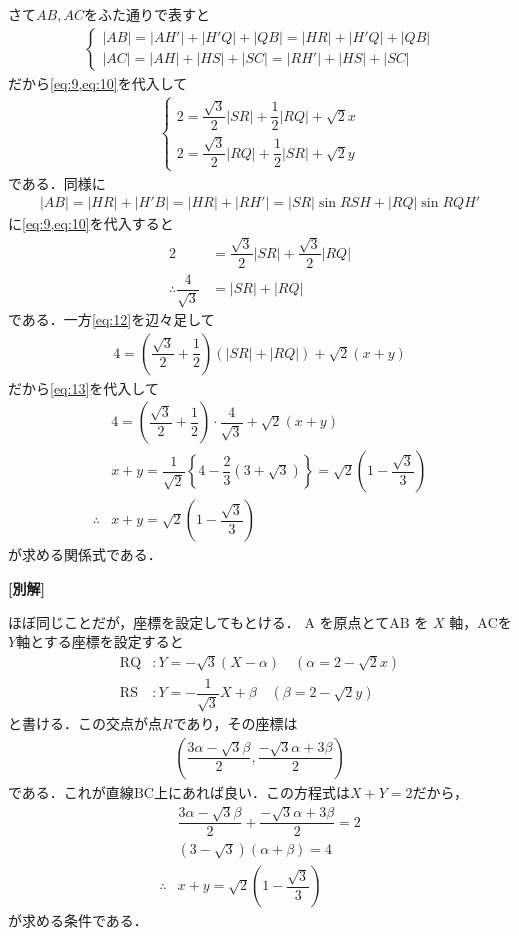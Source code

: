 \documentclass[../../main.tex]{subfiles}
\begin{document}
さて$AB,AC$をふた通りで表すと
\begin{align}
  \begin{cases}
    |AB|=|AH'|+|H'Q|+|QB|=|HR|+|H'Q|+|QB| \\
    |AC|=|AH|+|HS|+|SC|=|RH'|+|HS|+|SC|
  \end{cases}
\end{align}
だから\cref{eq:9,eq:10}を代入して
\begin{align}
  \begin{cases}
    2 = \dfrac{\sqrt{3}}{2}|SR| + \dfrac{1}{2}|RQ| + \sqrt{2}x \\
    2 = \dfrac{\sqrt{3}}{2}|RQ| + \dfrac{1}{2}|SR| + \sqrt{2}y
  \end{cases} \label{eq:12}
\end{align}
である．同様に
\begin{align}
  |AB|= |HR|+|H'B| = |HR|+|RH'| = |SR|\sin RSH + |RQ|\sin RQH'
\end{align}
に\cref{eq:9,eq:10}を代入すると
\begin{align}
  2 & = \dfrac{\sqrt{3}}{2}|SR| + \dfrac{\sqrt{3}}{2}|RQ| \\
  \therefore
  \dfrac{4}{\sqrt{3}} &= |SR| + |RQ| \label{eq:13}
\end{align}
である．一方\cref{eq:12}を辺々足して
\begin{align}
  4 = \left( \dfrac{\sqrt{3}}{2} + \dfrac{1}{2} \right)\left(|SR|+|RQ|\right) + \sqrt{2}\left(x+y\right) \label{eq:14}
\end{align}
だから\cref{eq:13}を代入して
\begin{align}
  & 4 = \left( \dfrac{\sqrt{3}}{2} + \dfrac{1}{2} \right)\cdot \dfrac{4}{\sqrt{3}} + \sqrt{2}\left(x+y\right) \\
  & x+ y = \dfrac{1}{\sqrt{2}} \left\{ 4 - \dfrac{2}{3}(3+\sqrt{3}) \right\} = \sqrt{2}\left( 1 - \dfrac{\sqrt{3}}{3} \right) \\
  \therefore
  & x+ y = \sqrt{2}\left( 1 - \dfrac{\sqrt{3}}{3} \right)
\end{align}
が求める関係式である．

{\bf [別解]}

ほぼ同じことだが，座標を設定してもとける．
$\mathrm{A}$ を原点とて$\mathrm{AB}$ を $X$ 軸，$\mathrm{AC}$を$Y$軸とする座標を設定すると
\begin{align}
  \mathrm{RQ} &: Y = -\sqrt{3}(X - \alpha) \quad (\alpha = 2 - \sqrt{2}x) \\
  \mathrm{RS} &: Y = -\dfrac{1}{\sqrt{3}}X + \beta \quad (\beta = 2 - \sqrt{2}y)
\end{align}
と書ける．この交点が点$R$であり，その座標は
\begin{align}
  \left( \dfrac{3\alpha - \sqrt{3}\beta}{2}, \dfrac{-\sqrt{3}\alpha + 3\beta}{2} \right)
\end{align}
である．これが直線$\mathrm{BC}$上にあれば良い．この方程式は$X+Y=2$だから，
\begin{align}
  & \dfrac{3\alpha  - \sqrt{3}\beta}{2} + \dfrac{-\sqrt{3}\alpha + 3\beta}{2} = 2 \\
  & (3 - \sqrt{3})(\alpha + \beta) = 4 \\
  \therefore
  &x + y = \sqrt{2} \left( 1 - \dfrac{\sqrt{3}}{3} \right)
\end{align}
が求める条件である．

\newpage
\end{document}
